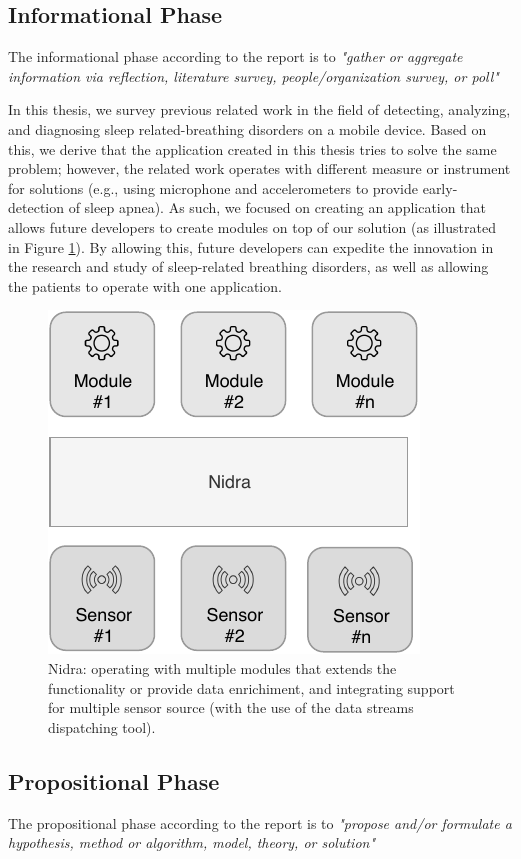 \subsection{Informational Phase}
The informational phase according to the report is to \textit{"gather or aggregate information via reflection, literature survey, people/organization survey, or poll"}

In this thesis, we survey previous related work in the field of detecting, analyzing, and diagnosing sleep related-breathing disorders on a mobile device. Based on this, we derive that the application created in this thesis tries to solve the same problem; however, the related work operates with different measure or instrument for solutions (e.g., using microphone and accelerometers to provide early-detection of sleep apnea). As such, we focused on creating an application that allows future developers to create modules on top of our solution (as illustrated in Figure \ref{fig:nidra_modules}). By allowing this, future developers can expedite the innovation in the research and study of sleep-related breathing disorders, as well as allowing the patients to operate with one application. 

\begin{figure}
    \centering
    \includegraphics[scale=0.8]{images/Nidramodules.pdf}
    \caption{Nidra: operating with multiple modules that extends the functionality or provide data enrichiment, and integrating support for multiple sensor source (with the use of the data streams dispatching tool).}
    \label{fig:nidra_modules}
\end{figure}

\subsection{Propositional Phase}
The propositional phase according to the report is to \textit{"propose and/or formulate a hypothesis, method or algorithm, model, theory, or solution"}


